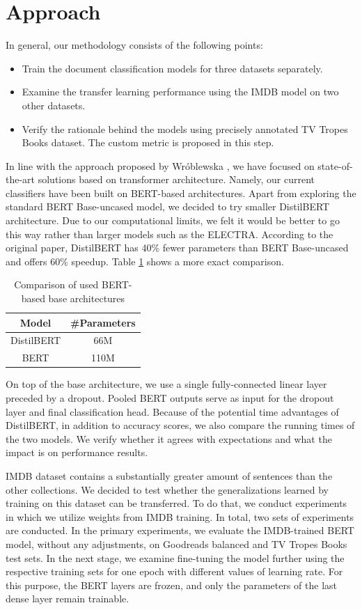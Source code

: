 \documentclass[11pt]{article}
\begin{document}
\section{Approach} \label{approach}

In general, our methodology consists of the following points:
\begin{itemize}
\item Train the document classification models for three datasets separately.
\item Examine the transfer learning performance using the IMDB model on two other datasets.
\item Verify the rationale behind the models using precisely annotated TV Tropes Books dataset. The custom metric is proposed in this step.
\end{itemize}

In line with the approach proposed by Wróblewska , we have focused on state-of-the-art solutions based on transformer architecture. Namely, our current classifiers have been built on BERT-based architectures. Apart from exploring the standard BERT Base-uncased model, we decided to try smaller DistilBERT architecture. Due to our computational limits, we felt it would be better to go this way rather than larger models such as the ELECTRA. According to the original paper, DistilBERT has 40\% fewer parameters than BERT Base-uncased and offers 60\% speedup. Table \ref{tab:bert-comparison} shows a more exact comparison.

\begin{table}[h]
    \centering
    \begin{tabular}{|c|c|}
        Model & \#Parameters \\\hline
        DistilBERT & 66M \\
        BERT & 110M
    \end{tabular}
    \caption{Comparison of used BERT-based base architectures}
    \label{tab:bert-comparison}
\end{table}

On top of the base architecture, we use a single fully-connected linear layer preceded by a dropout. Pooled BERT outputs serve as input for the dropout layer and final classification head. Because of the potential time advantages of DistilBERT, in addition to accuracy scores, we also compare the running times of the two models. We verify whether it agrees with expectations and what the impact is on performance results.


IMDB dataset contains a substantially greater amount of sentences than the other collections. We decided to test whether the generalizations learned by training on this dataset can be transferred. To do that, we conduct experiments in which we utilize weights from IMDB training. In total, two sets of experiments are conducted. In the primary experiments, we evaluate the IMDB-trained BERT model, without any adjustments, on Goodreads balanced and TV Tropes Books test sets. In the next stage, we examine fine-tuning the model further using the respective training sets for one epoch with different values of learning rate. For this purpose, the BERT layers are frozen, and only the parameters of the last dense layer remain trainable.
\end{document}
